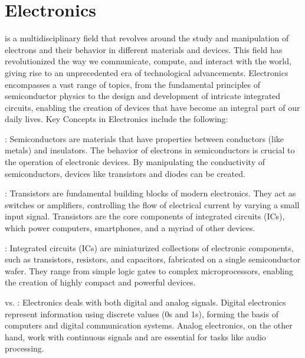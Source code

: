 \chapter{Electronics}
\thispagestyle{fancy}

 is a multidisciplinary field that revolves around the study and manipulation of electrons and their behavior in different materials and devices. This field has revolutionized the way we communicate, compute, and interact with the world, giving rise to an unprecedented era of technological advancements. Electronics encompasses a vast range of topics, from the fundamental principles of semiconductor physics to the design and development of intricate integrated circuits, enabling the creation of devices that have become an integral part of our daily lives. Key Concepts in Electronics include the following:

    \item {}: Semiconductors are materials that have properties between conductors (like metals) and insulators. The behavior of electrons in semiconductors is crucial to the operation of electronic devices. By manipulating the conductivity of semiconductors, devices like transistors and diodes can be created.

    \item {}: Transistors are fundamental building blocks of modern electronics. They act as switches or amplifiers, controlling the flow of electrical current by varying a small input signal. Transistors are the core components of integrated circuits (ICs), which power computers, smartphones, and a myriad of other devices.

    \item {}: Integrated circuits (ICs) are miniaturized collections of electronic components, such as transistors, resistors, and capacitors, fabricated on a single semiconductor wafer. They range from simple logic gates to complex microprocessors, enabling the creation of highly compact and powerful devices.

    \item {} vs. : Electronics deals with both digital and analog signals. Digital electronics represent information using discrete values (0s and 1s), forming the basis of computers and digital communication systems. Analog electronics, on the other hand, work with continuous signals and are essential for tasks like audio processing.

